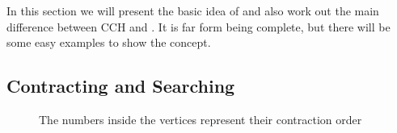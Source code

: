 In this section we will present the basic idea of \cite[Customization Contraction Hierarchies]{CCH} and also work out the main difference between CCH and \cite[Contraction Hierarchies]{Geisberger_2012}.
It is far form being complete, but there will be some easy examples to show the concept. 

\subsection{Contracting and Searching}

\begin{figure}
    \centering
    
    \caption{The numbers inside the vertices represent their contraction order}
    \label{fig:contrating_and_searching}
\end{figure}

